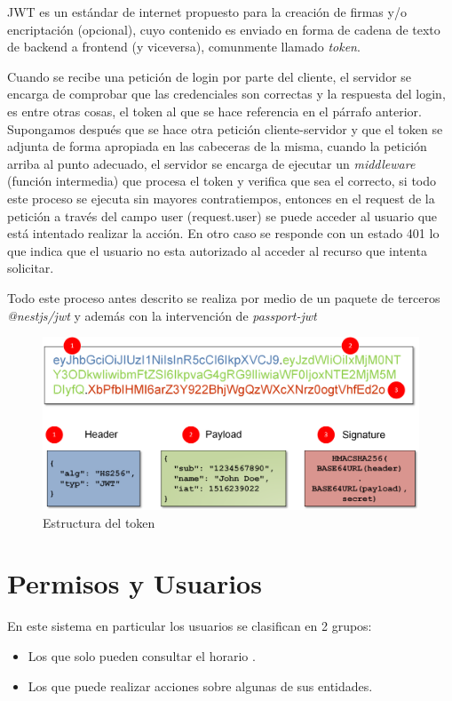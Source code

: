 JWT es un estándar de internet propuesto para la creación de firmas y/o encriptación (opcional), cuyo contenido es enviado en forma de cadena de texto de backend a frontend (y viceversa), comunmente llamado \textit{token}.

Cuando se recibe una petición de login por parte del cliente, el servidor se encarga de comprobar que las credenciales son correctas y la respuesta del login, es entre otras cosas, el token al que se hace referencia en el párrafo anterior. Supongamos después que se hace otra petición cliente-servidor y que el token se adjunta de forma apropiada en las cabeceras de la misma, cuando la petición arriba al punto adecuado, el servidor se encarga de ejecutar un \textit{middleware} (función intermedia) que procesa el token y verifica que sea el correcto, si todo este proceso se ejecuta sin mayores contratiempos, entonces en el request de la petición a través del campo user (request.user) se puede acceder al usuario que está intentado realizar la acción. En otro caso se responde con un estado 401 lo que indica que el usuario no esta autorizado al acceder al recurso que intenta solicitar. 

Todo este proceso antes descrito se realiza por medio de un paquete de terceros \textit{@nestjs/jwt} y además con la intervención de \textit{passport-jwt}

\begin{figure}[h!]
	\centering
	\includegraphics[width=0.95\linewidth]{images/Chapter 3/jwt1}
	\caption{Estructura del token}
	\label{fig:jwt}
\end{figure}

\section{Permisos y Usuarios}

En este sistema en particular los usuarios se clasifican en 2 grupos:

\begin{itemize}
	\item Los que solo pueden consultar el horario .
	\item Los que puede realizar acciones sobre algunas de sus entidades.
\end{itemize}

